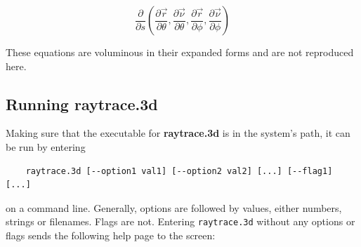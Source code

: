\begin{equation}
\frac{\partial}{\partial s}\left(\frac{\partial\vec{r}}{\partial\theta},\frac{\partial\vec{\nu}}{\partial\theta},\frac{\partial\vec{r}}{\partial\phi},\frac{\partial\vec{\nu}}{\partial\phi}\right)
\label{eq: 3d-angular}
\end{equation}

These equations are voluminous in their expanded forms and are not reproduced here.

\subsection{Running raytrace.3d}
\label{sec: raytrace.3d running}

Making sure that the executable for {\bf raytrace.3d} is in the system's path, it can be run by entering 
\begin{verbatim} 
    raytrace.3d [--option1 val1] [--option2 val2] [...] [--flag1] [...] 
\end{verbatim}
on a command line. Generally, options are followed by values, either numbers, strings or filenames. Flags are not. Entering \verb"raytrace.3d" without any options or flags sends the following help page to the screen: 

